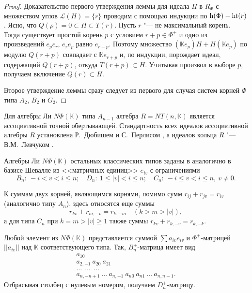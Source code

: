 \documentclass[a4paper,14pt,oneside,openany]{memoir}
\begin{document}
\begin{proof}
    Доказательство первого утверждения леммы для идеала $H$ в $R_{\Phi}$ с
    множеством углов $\mathcal{L}(H)=\{r\}$ проводим с помощью индукции по
    $\mathrm{h}(\Phi)-\operatorname{ht}(r)$. Ясно, что $Q(\rho) = 0 \subset H \subset T(r)$.
    Пусть $r$ "--- не максимальный корень. Тогда существует простой корень $p$ с
    условием $r+p \in \Phi^+$ и одно из произведений $e_pe_r$, $e_re_p$ равно
    $e_{r+p}$. Поэтому множество $(\mathbb{K}e_p)H + H(\mathbb{K}e_p)$ по модулю
    $Q(r+p)$ совпадает с $\mathbb{K}e_{r+p}$ и, по индукции, порождает идеал,
    содержащий $Q(r+p)$, откуда $T(r+p) \subset H$. Учитывая произвол в выборе $p$,
    получаем включение $Q(r) \subset H$.

    Второе утверждение леммы сразу следует из первого для случая систем корней
    $\Phi$ типа $A_2$, $B_2$ и $G_2$.
\end{proof}

Для алгебры Ли $N\Phi(\mathbb{K})$ типа $A_{n-1}$ алгебра $R=NT(n,\mathbb{K})$
является ассоциативной точной обертывающей. Стандартность всех идеалов
ассоциативной алгебры $R$ установлена Р.~Дюбишем и С.~Перлисом \cite[теорема
9]{Dub-Perl-1951}, а идеалов кольца $R$ "--- В.\nobreak\:М.~Левчуком
\cite[следствие~4.2]{vL74}.

Алгебры Ли $N\Phi(\mathbb{K})$ остальных классических типов заданы в
\cite[лемма 2]{vl90a_ru} аналогично в базисе Шевалле из <<матричных единиц>>
$e_{iv}$ с ограничениями
\[
    B_n: \ -i < v < i \leq n;\quad
    D_n: \ 1 \leq |v| < i \leq n;\quad
    C_n: \ -i \leq v < i \leq n, \ v \neq 0.
\]

К суммам двух корней, являющимся корнями, помимо сумм $r_{ij}+ r_{jv}=r_{iv}$
(аналогично типу $A_n$), здесь относятся еще суммы
\[
    r_{kv}+ r_{m,-v}=r_{k, -m}\quad (k>m>|v|),
\]
а для типа $C_n$ при $k =m>|v|\geq 1$ также суммы $r_{kv}+ r_{k,-v} =
r_{k,-k}$.

Любой элемент из $N\Phi(\mathbb{K})$ представляется суммой $\sum a_{iv}e_{iv}$
и $\Phi^+$-матрицей $||a_{iv}||$ над $\mathbb{K}$ соответствующего типа. Так,
$B_n^+$-матрица имеет вид
%
\[
    \begin{gathered}
        a_{10} \\
        a_{2,-1}\ a_{20}\ a_{21} \\
        \dots\ \ \dots\ \ \dots \\
        a_{n,-n+1}\ \dots\ a_{n,-1}\ a_{n0}\ a_{n1}\ \dots\ a_{n,n-1}.
    \end{gathered}
\]
%
Отбрасывая столбец с нулевым номером, получаем $D_n^+$-матрицу.
\end{document}
